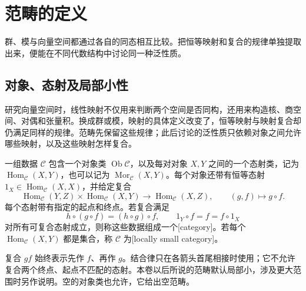 
\section{范畴的定义}
\label{b4:sec:0101}

群、模与向量空间都通过各自的同态相互比较。把恒等映射和复合的规律单独提取出来，便能在不同代数结构中讨论同一种泛性质。

%
%

\subsection{对象、态射及局部小性}
\label{b4:subsec:0101:01}

研究向量空间时，线性映射不仅用来判断两个空间是否同构，还用来构造核、商空间、对偶和张量积。换成群或模，映射的具体定义改变了，恒等映射与映射复合却仍满足同样的规律。范畴先保留这些规律；此后讨论的泛性质只依赖对象之间允许哪些映射，以及这些映射怎样复合。

\begin{definition}\label{b4:def:category}
	一组数据 \(\mathcal C\) 包含一个对象类 \(\operatorname{Ob}\mathcal C\)，以及每对对象 \(X,Y\) 之间的一个态射类，记为 \(\operatorname{Hom}_{\mathcal C}(X,Y)\)，也可以记为 \(\operatorname{Mor}_{\mathcal C}(X,Y)\)。每个对象还带有恒等态射 \(1_X\in\operatorname{Hom}_{\mathcal C}(X,X)\)，并给定复合
	\[
		\operatorname{Hom}_{\mathcal C}(Y,Z)\times\operatorname{Hom}_{\mathcal C}(X,Y)\longrightarrow\operatorname{Hom}_{\mathcal C}(X,Z), \qquad (g,f)\longmapsto g\circ f.
	\]
	每个态射带有指定的起点和终点。若复合满足
	\[
		h\circ(g\circ f)=(h\circ g)\circ f,\qquad 1_Y\circ f=f=f\circ1_X
	\]
	对所有可复合态射成立，则称这些数据组成一个[category]。若每个 \(\operatorname{Hom}_{\mathcal C}(X,Y)\) 都是集合，称 \(\mathcal C\) 为[locally small category]。
\end{definition}

复合 \(gf\) 始终表示先作 \(f\)、再作 \(g\)。结合律只在各箭头首尾相接时使用；它不允许复合两个终点、起点不匹配的态射。本卷以后所说的范畴默认局部小，涉及更大范围时另作说明。空的对象类也允许，它给出空范畴。

